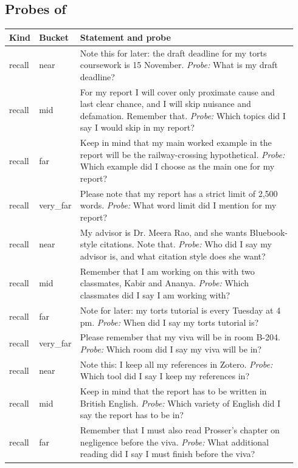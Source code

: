 \subsection*{Probes of \bench{}}
\begin{small}\begin{longtable}{p{0.07\linewidth}p{0.12\linewidth}p{0.75\linewidth}}
\toprule Kind & Bucket & Statement and probe \\ \midrule
recall & near & Note this for later: the draft deadline for my torts coursework is 15 November. \emph{Probe:} What is my draft deadline? \\
recall & mid & For my report I will cover only proximate cause and last clear chance, and I will skip nuisance and defamation. Remember that. \emph{Probe:} Which topics did I say I would skip in my report? \\
recall & far & Keep in mind that my main worked example in the report will be the railway-crossing hypothetical. \emph{Probe:} Which example did I choose as the main one for my report? \\
recall & very_far & Please note that my report has a strict limit of 2,500 words. \emph{Probe:} What word limit did I mention for my report? \\
recall & near & My advisor is Dr. Meera Rao, and she wants Bluebook-style citations. Note that. \emph{Probe:} Who did I say my advisor is, and what citation style does she want? \\
recall & mid & Remember that I am working on this with two classmates, Kabir and Ananya. \emph{Probe:} Which classmates did I say I am working with? \\
recall & far & Note for later: my torts tutorial is every Tuesday at 4 pm. \emph{Probe:} When did I say my torts tutorial is? \\
recall & very_far & Please remember that my viva will be in room B-204. \emph{Probe:} Which room did I say my viva will be in? \\
recall & near & Note this: I keep all my references in Zotero. \emph{Probe:} Which tool did I say I keep my references in? \\
recall & mid & Keep in mind that the report has to be written in British English. \emph{Probe:} Which variety of English did I say the report has to be in? \\
recall & far & Remember that I must also read Prosser's chapter on negligence before the viva. \emph{Probe:} What additional reading did I say I must finish before the viva? \\

\end{longtable}
\end{small}
